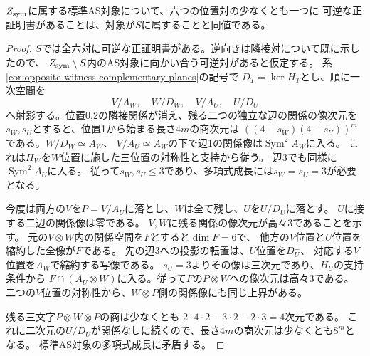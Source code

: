 \begin{theorem}[対称閉包内での任意の可逆正証明書]\label{thm:one-positive-AS-in-symmetric-closure}
$Z_{\rm sym}$に属する標準AS対象について、六つの位置対の少なくとも一つに
可逆な正証明書があることは、対象が$S$に属することと同値である。
\end{theorem}
\begin{proof}
$S$では全六対に可逆な正証明書がある。逆向きは隣接対について既に示したので、
$Z_{\rm sym}\setminus S$内のAS対象に向かい合う可逆対があると仮定する。
系\ref{cor:opposite-witness-complementary-planes}の記号で
$D_T=\ker H_T$とし、順に一次空間を
\[
 V/A_W,\quad W/D_W,\quad V/A_U,\quad U/D_U
\]
へ射影する。位置0,2の隣接関係が消え、残る二つの独立な辺の関係の像次元を
$s_W,s_U$とすると、位置1から始まる長さ$4m$の商次元は
$((4-s_W)(4-s_U))^m$である。$W/D_W\simeq A_W$、
$V/A_U\simeq A_W$の下で辺1の関係像は$\operatorname{Sym}^2 A_W$に入る。
これは$H_W$を$W$位置に施した三位置の対称性と支持から従う。
辺3でも同様に$\operatorname{Sym}^2 A_U$に入る。
従って$s_W,s_U\le3$であり、多項式成長には$s_W=s_U=3$が必要となる。

今度は両方の$V$を$P=V/A_U$に落とし、$W$は全て残し、$U$を$U/D_U$に落とす。
$U$に接する二辺の関係像は零である。
$V,W$に残る関係の像次元が高々3であることを示す。
元の$V\otimes W$内の関係空間を$F$とすると$\dim F=6$で、
他方の$V$位置と$U$位置を縮約した全像が$F$である。
先の辺3への投影の転置は、$U$位置を$D_U^\perp$、
対応する$V$位置を$A_W^\perp$で縮約する写像である。
$s_U=3$よりその像は三次元であり、$H_U$の支持条件から
$F\cap(A_U\otimes W)$に入る。従って$F$の$P\otimes W$への像次元は高々3である。
二つの$V$位置の対称性から、$W\otimes P$側の関係像にも同じ上界がある。

残る三文字$P\otimes W\otimes P$の商は少なくとも
$2\cdot4\cdot2-3\cdot2-2\cdot3=4$次元である。
これに二次元の$U/D_U$が関係なしに続くので、長さ$4m$の商次元は少なくとも$8^m$となる。
標準AS対象の多項式成長に矛盾する。
\end{proof}

